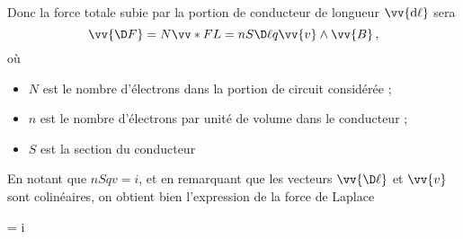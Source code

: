 \documentclass{cours}
\begin{document}
Donc la force totale subie par la portion de conducteur de longueur $\vv{\mathrm{d}\ell}$ sera 
\begin{equation}
  \vv{\D F} = N \vv*{F}{L} = nS\D \ell q \vv{v} \wedge \vv{B}\, ,
\end{equation}
où 
\begin{itemize}
  \item $N$ est le nombre d'électrons dans la portion de circuit considérée ;
  \item $n$ est le nombre d'électrons par unité de volume dans le conducteur ;
  \item $S$ est la section du conducteur 
\end{itemize}
En notant que $nSqv = i$, et en remarquant que les vecteurs $\vv{\D\ell}$ et $\vv{v}$ sont colinéaires, on obtient bien l'expression de la force de Laplace
\begin{eqencadre}
   = i\vv{\D \ell} \wedge {}
\end{eqencadre}
\end{document}
